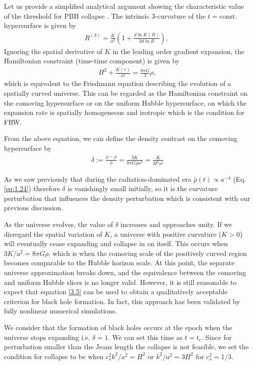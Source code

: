 Let us provide a simplified analytical argument showing the characteristic value of the threshold for PBH collapse \cite{Sasaki_2018}. The intrinsic 3-curvature of the $t=\text{const.}$ hypersurface is given by 
\begin{align*}
    R^{(3)}=\frac{K}{a^2}\left(1+\frac{d\ln K(R)}{3d\ln R}\right) ,\ 
\end{align*}
Ignoring the spatial derivative of $K$ in the leading order gradient expansion, the Hamiltonian constraint (time-time component) is given by
\begin{align}
    H^2+\frac{K(r)}{a^2}=\frac{8\pi G}{3}\rho,\label{3.5}
\end{align}
 which is equivalent to the Friedmann equation describing the evolution of a spatially curved universe. This can be regarded as the Hamiltonian constraint on the comoving hypersurface or on the uniform Hubble hypersurface, on which the expansion rate is spatially homogeneous and isotropic which is the condition for FRW. 

From the above equation, we can define the density contrast on the comoving hypersurface by
\begin{align}
    \delta:=\frac{\rho-\bar{\rho}}{\bar{\rho}}=\frac{3 K}{8 \pi G \bar{\rho} a^2}=\frac{K}{H^2 a^2}\label{3.6}
\end{align}


As we saw previously that during the radiation-dominated era $\bar{\rho}(t) \propto a^{-4}$ (Eq. \ref{eq:1.24})  therefore $\delta$ is vanishingly small initially, so it is the curvature perturbation that influences the density perturbation which is consistent with our previous discussion.

As the universe evolves, the value of $\delta$ increases and approaches unity. If we disregard the spatial variation of $K$, a universe with positive curvature ($K>0$) will eventually cease expanding and collapse in on itself. This occurs when $3 K / a^2 = 8 \pi G \rho$, which is when the comoving scale of the positively curved region becomes comparable to the Hubble horizon scale. At this point, the separate universe approximation breaks down, and the equivalence between the comoving and uniform Hubble slices is no longer valid. However, it is still reasonable to expect that equation \ref{3.5} can be used to obtain a qualitatively acceptable criterion for black hole formation. In fact, this approach has been validated by fully nonlinear numerical simulations.

We consider that the formation of black holes occurs at the epoch when the universe stops expanding i.e. $\delta = 1$. We can set this time as $t=t_c$. Since for perturbation smaller than the Jeans length the collapse is not feasible, we set the condition for collapse to be when $c_s^2 k^2 / a^2=H^2$ or $k^2 / a^2=3 H^2$ for $c_s^2=1 / 3$.


